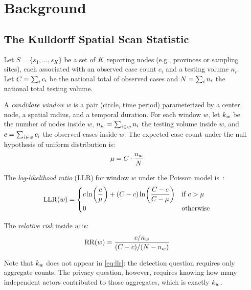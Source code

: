 
\section{Background}
\label{sec:background}

\subsection{The Kulldorff Spatial Scan Statistic}
\label{sec:background:kulldorff}

Let $S = \{s_1, \ldots, s_K\}$ be a set of $K$ reporting nodes (e.g., provinces or
sampling sites), each associated with an observed case count $c_i$ and a testing
volume $n_i$.
Let $C = \sum_i c_i$ be the national total of observed cases and $N = \sum_i n_i$
the national total testing volume.

A \emph{candidate window} $w$ is a pair (circle, time period) parameterized by a center
node, a spatial radius, and a temporal duration.
For each window $w$, let $k_w$ be the number of nodes inside $w$,
$n_w = \sum_{i \in w} n_i$ the testing volume inside $w$,
and $c = \sum_{i \in w} c_i$ the observed cases inside $w$.
The expected case count under the null hypothesis of uniform distribution is:
\begin{equation}
    \mu = C \cdot \frac{n_w}{N}
    \label{eq:mu}
\end{equation}

The \emph{log-likelihood ratio} (LLR) for window $w$ under the Poisson model
is~\cite{kulldorff1997}:
\begin{equation}
    \mathrm{LLR}(w) =
    \begin{cases}
        c \ln\!\left(\dfrac{c}{\mu}\right)
        + (C - c) \ln\!\left(\dfrac{C - c}{C - \mu}\right)
        & \text{if } c > \mu \\[6pt]
        0 & \text{otherwise}
    \end{cases}
    \label{eq:llr}
\end{equation}

The \emph{relative risk} inside $w$ is:
\begin{equation}
    \mathrm{RR}(w) = \frac{c / n_w}{(C - c) / (N - n_w)}
    \label{eq:rr}
\end{equation}

Note that $k_w$ does not appear in \cref{eq:llr}: the detection question requires
only aggregate counts.
The privacy question, however, requires knowing how many independent actors contributed
to those aggregates, which is exactly $k_w$.

